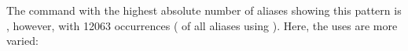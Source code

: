 The command with the highest absolute number of aliases showing this pattern is , however, with \num{12063} occurrences ( of all aliases using ).
Here, the uses are more varied:
\begin{center}
\\
\\
\end{center}
